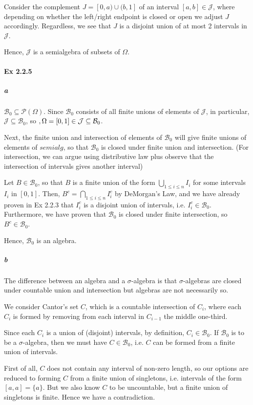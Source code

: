 \documentclass[a4paper]{article}
\newcommand{\powerset}[1]{\mathcal{P}(#1)}
\newcommand{\semialg}[0]{\mathcal{J}} %
\begin{document}
Consider the complement $J = [0, a)\cup (b, 1]$ of an interval $[a,b]\in \semialg$, where depending on whether the left/right endpoint is closed or open we adjust $J$ accordingly. Regardless, we see that $J$ is a disjoint union of at most 2 intervals in $\semialg$.

Hence, $\semialg$ is a semialgebra of subsets of $\Omega$.

\paragraph{Ex 2.2.5} 
\subparagraph{a} $\mathcal{B}_0\subseteq \powerset{\Omega}$. Since $\mathcal{B}_0$ consists of all finite unions of elements of $\semialg$, in particular, $\semialg \subseteq \mathcal{B}_0$, so $\empty, \Omega = [0,1]\in \semialg \subseteq \mathcal{B}_0$.

Next, the finite union and intersection of elements of $\mathcal{B}_0$ will give finite unions of elements of $semialg$, so that $\mathcal{B}_0$ is closed under finite union and intersection. (For intersection, we can argue using distributive law plus observe that the intersection of intervals gives another interval)

Let $B\in \mathcal{B}_0$, so that $B$ is a finite union of the form $\bigcup_{1\leq i\leq n}I_i$ for some intervals $I_i$ in $[0,1]$. Then, $B^c = \bigcap_{1\leq i\leq n}I_i^c$ by DeMorgan's Law, and we have already proven in Ex 2.2.3 that $I_i^c$ is a disjoint union of intervals, i.e. $I_i^c\in \mathcal{B}_0$. Furthermore, we have proven that $\mathcal{B}_0$ is closed under finite intersection, so $B^c\in \mathcal{B}_0$.

Hence, $\mathcal{B}_0$ is an algebra.

\subparagraph{b} The difference between an algebra and a $\sigma$-algebra is that $\sigma$-algebras are closed under countable union and intersection but algebras are not necessarily so.

We consider Cantor's set $C$, which is a countable intersection of $C_i$, where each $C_i$ is formed by removing from each interval in $C_{i-1}$ the middle one-third.

Since each $C_i$ is a union of (disjoint) intervals, by definition, $C_i\in \mathcal{B}_0$. If $\mathcal{B}_0$ is to be a $\sigma$-algebra, then we must have $C\in \mathcal{B}_0$, i.e. $C$ can be formed from a finite union of intervals.

First of all, $C$ does not contain any interval of non-zero length, so our options are reduced to forming $C$ from a finite union of singletons, i.e. intervals of the form $[a,a]=\{a\}$. But we also know $C$ to be uncountable, but a finite union of singletons is finite. Hence we have a contradiction.
\end{document}
